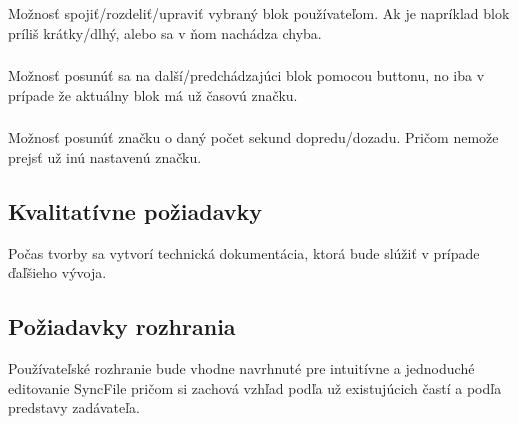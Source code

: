 \documentclass{article}
\begin{document}
\subsubsection{}
Možnosť spojiť/rozdeliť/upraviť vybraný blok používateľom. Ak je napríklad blok príliš krátky/dlhý, alebo sa v ňom nachádza chyba. 

\subsubsection{}
Možnosť posunúť sa na další/predchádzajúci blok pomocou buttonu, no iba v prípade že aktuálny blok má už časovú značku. 

\subsubsection{}
Možnosť posunúť značku o daný počet sekund dopredu/dozadu. Pričom nemože prejsť už inú nastavenú značku.

\subsection{Kvalitatívne požiadavky}
Počas tvorby sa vytvorí technická dokumentácia, ktorá bude slúžiť v prípade ďaľšieho vývoja.

\subsection{Požiadavky rozhrania}
Používateľské rozhranie bude vhodne navrhnuté pre intuitívne a jednoduché editovanie SyncFile pričom si zachová vzhľad podľa už existujúcich častí a podľa predstavy zadávateľa.
\end{document}
